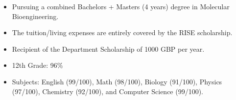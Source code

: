 \documentclass[10pt,a4paper,ragged2e]{altacv}
\begin{document}
\begin{itemize}
    \item Pursuing a combined Bachelors + Masters (4 years) degree in Molecular Bioengineering.
    \item The tuition/living expenses are entirely covered by the RISE scholarship.
    \item Recipient of the Department Scholarship of 1000 GBP per year.
\end{itemize}
\divider
{}
\begin{itemize}
    \item 12th Grade: 96\%
    \item Subjects: English (99/100), Math (98/100), Biology (91/100), Physics (97/100), Chemistry (92/100), and Computer Science (99/100).
\end{itemize}
\end{document}
